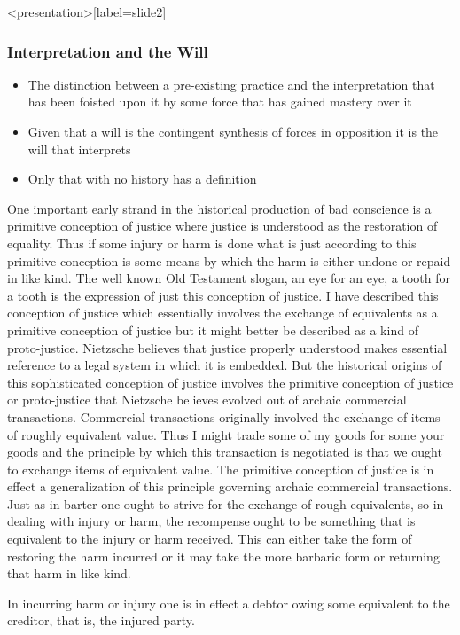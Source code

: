 \begin{frame}<presentation>[label=slide2]
    \frametitle{Interpretation and the Will}
        \begin{itemize}
            \item<1-> The distinction between a pre-existing practice and the interpretation that has been foisted upon it by some force that has gained mastery over it
            \item<2-> Given that a will is the contingent synthesis of forces in opposition it is the will that interprets
            \item<3-> Only that with no history has a definition  
        \end{itemize}
\end{frame}

One important early strand in the historical production of bad conscience is a primitive conception of justice where justice is understood as the restoration of equality. Thus if some injury or harm is done what is just according to this primitive conception is some means by which the harm is either undone or repaid in like kind. The well known Old Testament slogan, an eye for an eye, a tooth for a tooth is the expression of just this conception of justice. I have described this conception of justice which essentially involves the exchange of equivalents as a primitive conception of justice but it might better be described as a kind of proto-justice. Nietzsche believes that justice properly understood makes essential reference to a legal system in which it is embedded. But the historical origins of this sophisticated conception of justice involves the primitive conception of justice or proto-justice that Nietzsche believes evolved out of archaic commercial transactions. Commercial transactions originally involved the exchange of items of roughly equivalent value. Thus I might trade some of my goods for some your goods and the principle by which this transaction is negotiated is that we ought to exchange items of equivalent value. The primitive conception of justice is in effect a generalization of this principle governing archaic commercial transactions. Just as in barter one ought to strive for the exchange of rough equivalents, so in dealing with injury or harm, the recompense ought to be something that is equivalent to the injury or harm received. This can either take the form of restoring the harm incurred or it may take the more barbaric form or returning that harm in like kind.

In incurring harm or injury one is in effect a debtor owing some equivalent to the creditor, that is, the injured party.

